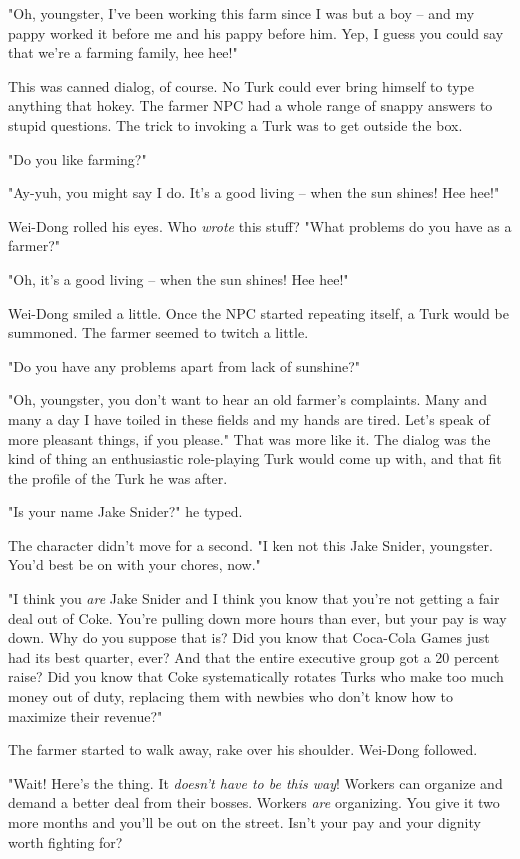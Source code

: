 "Oh, youngster, I've been working this farm since I was but a boy
-- and my pappy worked it before me and his pappy before him. Yep,
I guess you could say that we're a farming family, hee hee!"

This was canned dialog, of course. No Turk could ever bring himself
to type anything that hokey. The farmer NPC had a whole range of
snappy answers to stupid questions. The trick to invoking a Turk
was to get outside the box.

"Do you like farming?"

"Ay-yuh, you might say I do. It's a good living -- when the sun
shines! Hee hee!"

Wei-Dong rolled his eyes. Who \emph{wrote} this stuff? "What
problems do you have as a farmer?"

"Oh, it's a good living -- when the sun shines! Hee hee!"

Wei-Dong smiled a little. Once the NPC started repeating itself, a
Turk would be summoned. The farmer seemed to twitch a little.

"Do you have any problems apart from lack of sunshine?"

"Oh, youngster, you don't want to hear an old farmer's complaints.
Many and many a day I have toiled in these fields and my hands are
tired. Let's speak of more pleasant things, if you please." That
was more like it. The dialog was the kind of thing an enthusiastic
role-playing Turk would come up with, and that fit the profile of
the Turk he was after.

"Is your name Jake Snider?" he typed.

The character didn't move for a second. "I ken not this Jake
Snider, youngster. You'd best be on with your chores, now."

"I think you \emph{are} Jake Snider and I think you know that
you're not getting a fair deal out of Coke. You're pulling down
more hours than ever, but your pay is way down. Why do you suppose
that is? Did you know that Coca-Cola Games just had its best
quarter, ever? And that the entire executive group got a 20 percent
raise? Did you know that Coke systematically rotates Turks who make
too much money out of duty, replacing them with newbies who don't
know how to maximize their revenue?"

The farmer started to walk away, rake over his shoulder. Wei-Dong
followed.

"Wait! Here's the thing. It \emph{doesn't have to be this way}!
Workers can organize and demand a better deal from their bosses.
Workers \emph{are} organizing. You give it two more months and
you'll be out on the street. Isn't your pay and your dignity worth
fighting for?

